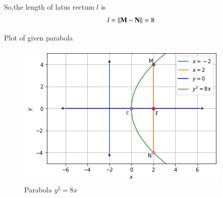 \documentclass[journal,12pt,twocolumn]{IEEEtran}
\begin{document}
So,the length of latus rectum $l$ is 
\begin{align}
l = \left\lVert\mathbf{M}-\mathbf{N}\right\rVert = 8
\end{align}

Plot of given parabola

\begin{figure}[!ht]
\centering
\includegraphics[width=\columnwidth]{Figure6}
\caption{Parabola $y^2=8x$ }
\label{fig:parabola}	
\end{figure}
\end{document}
